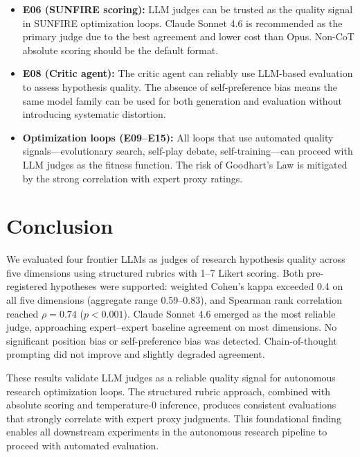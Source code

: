 \documentclass[11pt,a4paper]{article}
\begin{document}
\begin{itemize}
  \item \textbf{E06 (SUNFIRE scoring):} LLM judges can be trusted as the
    quality signal in SUNFIRE optimization loops.  Claude Sonnet 4.6 is
    recommended as the primary judge due to the best agreement and lower
    cost than Opus.  Non-CoT absolute scoring should be the default format.
  \item \textbf{E08 (Critic agent):} The critic agent can reliably use
    LLM-based evaluation to assess hypothesis quality.  The absence of
    self-preference bias means the same model family can be used for both
    generation and evaluation without introducing systematic distortion.
  \item \textbf{Optimization loops (E09--E15):} All loops that use
    automated quality signals---evolutionary search, self-play debate,
    self-training---can proceed with LLM judges as the fitness function.
    The risk of Goodhart's Law is mitigated by the strong correlation
    with expert proxy ratings.
\end{itemize}

\section{Conclusion}
\label{sec:conclusion}

We evaluated four frontier LLMs as judges of research hypothesis quality
across five dimensions using structured rubrics with 1--7 Likert scoring.
Both pre-registered hypotheses were supported: weighted Cohen's kappa
exceeded 0.4 on all five dimensions (aggregate range 0.59--0.83), and
Spearman rank correlation reached $\rho = 0.74$ ($p < 0.001$).  Claude
Sonnet 4.6 emerged as the most reliable judge, approaching expert--expert
baseline agreement on most dimensions.  No significant position bias or
self-preference bias was detected.  Chain-of-thought prompting did not
improve and slightly degraded agreement.

These results validate LLM judges as a reliable quality signal for
autonomous research optimization loops.  The structured rubric approach,
combined with absolute scoring and temperature-0 inference, produces
consistent evaluations that strongly correlate with expert proxy
judgments.  This foundational finding enables all downstream experiments
in the autonomous research pipeline to proceed with automated evaluation.
\end{document}
